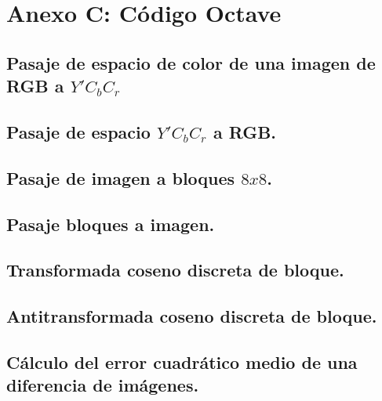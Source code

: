 \documentclass[%
	final,
	reprint,
	notitlepage,
	narroweqnarray,
	inline,
	twoside,
	invited
	]{ieee}
\begin{document}

\section*{Anexo C: Código Octave}

\subsection{Pasaje de espacio de color de una imagen de RGB a $Y'C_bC_r$}


\subsection{Pasaje de espacio $Y'C_bC_r$ a RGB. }


\subsection{Pasaje de imagen a bloques $8x8$. }


\subsection{Pasaje bloques a imagen. }


\subsection{Transformada coseno discreta de bloque. }


\subsection{Antitransformada coseno discreta de bloque. }


\subsection{Cálculo del error cuadrático medio de una diferencia de imágenes. }
\end{document}
